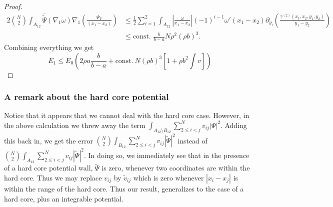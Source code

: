 \documentclass[a4paper,11pt]{article}
\newcommand{\abs}[1]{\left\lvert #1 \right\rvert}
\numberwithin{equation}{section}
\begin{document}
\begin{proof}
\begin{equation}
		\begin{aligned}
		2\binom{N}{2}\int_{A_{12}}\overline{\tilde{\Psi}}(\nabla_1\omega)\nabla_1\left(\frac{\Psi_F}{(x_1-x_2)}\right)&\leq\frac12\sum_{i=1}^{2}\int_{A_{12}}\abs{\frac{\omega}{x_1-x_2}}(-1)^{i-1}\omega'(x_1-x_2)\partial_{y_i}\left(\frac{\gamma^{(2)}(x_1,x_2,y_1,y_2)}{y_1-y_2}\right)\\
		&\leq \text{const. }\frac{b}{b-a}N\rho^2(\rho b)^3.
		\end{aligned}
		\end{equation}
		Combining everything we get \begin{equation}
		E_1\leq E_0 \left(2\rho a\frac{b}{b-a}+ \text{const.}\ N(\rho b)^3\left[ 1+ \rho b^2\int v\right]\right)
		\end{equation}
	\end{proof}
		\subsubsection{A remark about the hard core potential}
		Notice that it appears that we cannot deal with the hard core case. However, in the above calculation we threw away the term $ \int_{A_{12}\setminus B_{12}} \sum_{2\leq i<j}^{N}v_{ij}\abs{\Psi}^2 $. Adding this back in, we get the error $ \binom{N}{2}\int_{B_{12}} \sum_{2\leq i<j}^{N}v_{ij}\abs{\tilde{\Psi}}^2 $ instead of $ \binom{N}{2}\int_{A_{12}} \sum_{2\leq i<j}^{N}v_{ij}\abs{\tilde{\Psi}}^2 $. In doing so, we immediately see that in the presence of a hard core potential wall, $ \tilde{\Psi} $ is zero, whenever two coordinates are within the hard core. Thus we may replace $ v_{ij} $ by $ \tilde{v}_{ij} $ which is zero whenever $ \abs{x_i-x_j} $ is within the range of the hard core. Thus our result, generalizes to the case of a hard core, plus an integrable potential.
\end{document}
